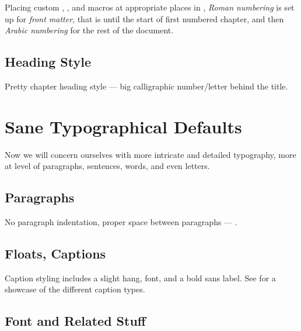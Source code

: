 Placing custom \custommacro{\frontmatter}, \custommacro{\mainmatter}, and \custommacro{\backmatter} macros at appropriate places in , \emph{Roman numbering} is set up for \emph{front matter}, that is until the start of first numbered chapter, and then \emph{Arabic numbering} for the rest of the document.


\subsection{Heading Style}%
\label{sub:Heading Style}

Pretty chapter heading style --- big calligraphic number/letter behind the title.


\section{Sane Typographical Defaults}%
\label{sec:Sane Typographical Defaults}

Now we will concern ourselves with more intricate and detailed typography, more at level of paragraphs, sentences, words, and even letters.

\subsection{Paragraphs}%
\label{sub:Paragraphs}

No paragraph indentation, proper space between paragraphs --- .

\subsection{Floats, Captions}%
\label{sub:Floats_Captions}

Caption styling includes a slight hang, \macro{\footnotesize} font, and a bold sans label.
See  for a showcase of the different caption types.


\subsection{Font and Related Stuff}%
\label{sub:Font}

